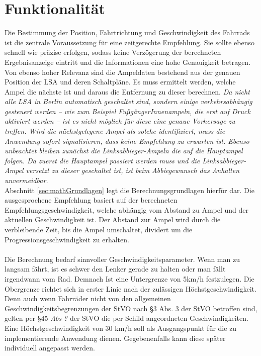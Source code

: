 \section{Funktionalität}
Die Bestimmung der Position, Fahrtrichtung und Geschwindigkeit des Fahrrads ist die zentrale Voraussetzung für eine zeitgerechte Empfehlung. Sie sollte ebenso schnell wie präzise erfolgen, sodass keine Verzögerung der berechneten Ergebnisanzeige eintritt und die Informationen eine hohe Genauigkeit betragen.\\
Von ebenso hoher Relevanz sind die Ampeldaten bestehend aus der genauen Position der \gls{LSA} und deren Schaltpläne. Es muss ermittelt werden, welche Ampel die nächste ist und daraus die Entfernung zu dieser berechnen. 
\textit{Da nicht alle \gls{LSA} in Berlin automatisch geschaltet sind, sondern einige verkehrsabhängig gesteuert werden -- wie zum Beispiel FußgängerInnenampeln, die erst auf Druck aktiviert werden -- ist es nicht möglich für diese eine genaue Vorhersage zu treffen. Wird die nächstgelegene Ampel als solche identifiziert, muss die Anwendung sofort signalisieren, dass keine Empfehlung zu erwarten ist. Ebenso unbeachtet bleiben zunächst die Linksabbieger-Ampeln die auf die Hauptampel folgen. Da zuerst die Hauptampel passiert werden muss und die Linksabbieger-Ampel versetzt zu dieser geschaltet ist, ist beim Abbiegewunsch das Anhalten unvermeidbar.}\\
Abschnitt \ref{sec:mathGrundlagen} legt die Berechnungsgrundlagen hierfür dar. Die ausgesprochene Empfehlung basiert auf der berechneten Empfehlungsgeschwindigkeit, welche abhängig vom Abstand zu Ampel und der aktuellen Geschwindigkeit ist. Der Abstand zur Ampel wird durch die verbleibende Zeit, bis die Ampel umschaltet, dividert um die Progressionsgeschwindigkeit zu erhalten.\\\\
Die Berechnung bedarf sinnvoller Geschwindigkeitsparameter. Wenn man zu langsam fährt, ist es schwer den Lenker gerade zu halten oder man fällt irgendwann vom Rad. Demnach Ist eine Untergrenze von 5km/h festzulegen. Die Obergrenze richtet sich in erster Linie nach der zulässigen Höchstgeschwindigkeit. Denn auch wenn Fahrräder nicht von den allgemeinen Geschwindigkeitsbegrenzungen der StVO nach \S 3 Abs. 3 der StVO betroffen sind, gelten per \S 45 \textit{Abs ?} der StVO die per Schild angeordneten Geschwindigkeiten. Eine Höchstgeschwindigkeit von 30 km/h soll als Ausgangspunkt für die zu implementierende Anwendung dienen. Gegebenenfalls kann diese später individuell angepasst werden. \\

